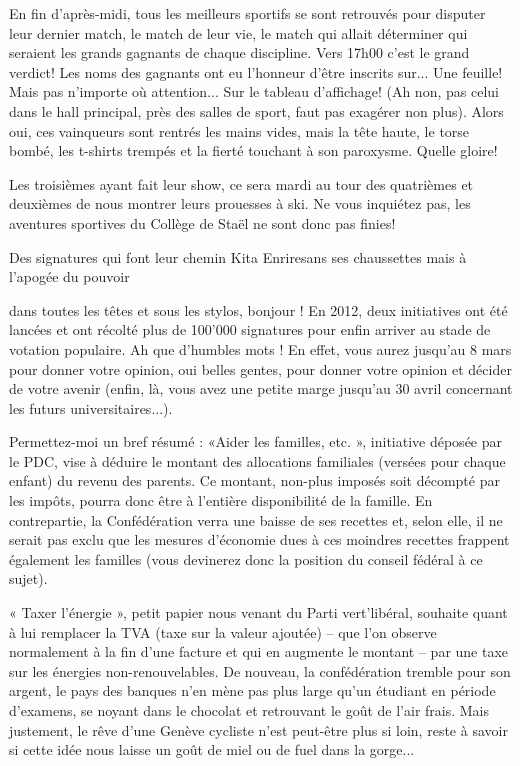 \begin{article}
\begin{spacing}{.94}
En fin d'après-midi, tous les meilleurs sportifs se sont retrouvés pour disputer leur dernier match, le match de leur vie, le match qui allait déterminer qui seraient les grands gagnants de chaque discipline. Vers 17h00 c'est le grand verdict! Les noms des gagnants ont eu l'honneur d'être inscrits sur... Une feuille!  Mais pas n'importe où attention... Sur le tableau d'affichage! (Ah non, pas celui dans le hall principal, près des salles de sport, faut pas exagérer non plus). Alors oui, ces vainqueurs sont rentrés les mains vides, mais la tête haute, le torse bombé, les t-shirts trempés et la fierté touchant à son paroxysme. Quelle gloire!

Les troisièmes ayant fait leur show, ce sera mardi au tour des quatrièmes et deuxièmes de nous montrer leurs prouesses à ski. Ne vous inquiétez pas, les aventures sportives du Collège de Staël ne sont donc pas finies!
\end{spacing}
\end{article}


\vspace*{-1mm}\ligne\vspace*{-4mm}


\begin{article}
{Des signatures qui font leur chemin}
{Kita Enrire}{sans ses chaussettes mais à l'apogée du pouvoir}

 dans toutes les têtes et sous les stylos, bonjour ! En 2012, deux initiatives ont été lancées et ont récolté plus de 100'000 signatures pour enfin arriver au stade de votation populaire. Ah que d'humbles mots ! En effet, vous aurez jusqu'au 8 mars pour donner votre opinion, oui belles gentes, pour donner votre opinion et décider de votre avenir (enfin, là, vous avez une petite marge jusqu'au 30 avril concernant les futurs universitaires...). 

Permettez-moi un bref résumé : «Aider les familles, etc. », initiative déposée par le PDC, vise à déduire le montant des allocations familiales (versées pour chaque enfant) du revenu des parents. Ce montant, non-plus imposés soit décompté par les impôts, pourra donc être à l'entière disponibilité de la famille. En contrepartie, la Confédération verra une baisse de ses recettes et, selon elle, il ne serait pas exclu que les mesures d'économie dues à ces moindres recettes frappent également les familles (vous devinerez donc la position du conseil fédéral à ce sujet). 

« Taxer l’énergie », petit papier nous venant du Parti vert'libéral, souhaite quant à lui remplacer la TVA (taxe sur la valeur ajoutée) – que l'on observe normalement à la fin d'une facture et qui en augmente le montant – par une taxe sur les énergies non-renouvelables. De nouveau, la confédération tremble pour son argent, le pays des banques n'en mène pas plus large qu'un étudiant en période d'examens, se noyant dans le chocolat et retrouvant le goût de l'air frais. Mais justement, le rêve d'une Genève cycliste n'est peut-être plus si loin, reste à savoir si cette idée nous laisse un goût de miel ou de fuel dans la gorge...

\end{article}




